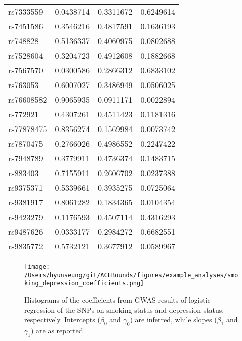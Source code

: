\documentclass[
]{article}
\theoremstyle{plain}
\begin{document}
{\begin{table}[H]
\begin{minipage}{0.5\linewidth}
\begin{table}[H]
\begin{tabular}{lrrr}
\addlinespace
rs7333559 & 0.0438714 & 0.3311672 & 0.6249614\\
rs7451586 & 0.3546216 & 0.4817591 & 0.1636193\\
rs748828 & 0.5136337 & 0.4060975 & 0.0802688\\
rs7528604 & 0.3204723 & 0.4912608 & 0.1882668\\
rs7567570 & 0.0300586 & 0.2866312 & 0.6833102\\
\addlinespace
rs763053 & 0.6007027 & 0.3486949 & 0.0506025\\
rs76608582 & 0.9065935 & 0.0911171 & 0.0022894\\
rs772921 & 0.4307261 & 0.4511423 & 0.1181316\\
rs77878475 & 0.8356274 & 0.1569984 & 0.0073742\\
rs7870475 & 0.2766026 & 0.4986552 & 0.2247422\\
\addlinespace
rs7948789 & 0.3779911 & 0.4736374 & 0.1483715\\
rs883403 & 0.7155911 & 0.2606702 & 0.0237388\\
rs9375371 & 0.5339661 & 0.3935275 & 0.0725064\\
rs9381917 & 0.8061282 & 0.1834365 & 0.0104354\\
rs9423279 & 0.1176593 & 0.4507114 & 0.4316293\\
\addlinespace
rs9487626 & 0.0333177 & 0.2984272 & 0.6682551\\
rs9835772 & 0.5732121 & 0.3677912 & 0.0589967\\
\bottomrule
\end{tabular}
\end{table}


  \end{minipage}
\end{table}

\begin{figure}[H]
  \center
  \texttt{[image: /Users/hyunseung/git/ACEBounds/figures/example\_analyses/smoking\_depression\_coefficients.png]}
  \caption{Histograms of the coefficients from GWAS results of logistic regression of the SNPs on smoking status and depression status, respectively. Intercepts ($\beta_0$ and $\gamma_0$) are inferred, while slopes ($\beta_1$ and $\gamma_1$) are as reported.}
  \label{fig:marginal-distribution-of-coefficients-depression}
\end{figure}

}
\end{document}
